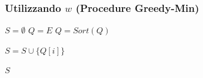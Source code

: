 \subsubsection{Utilizzando $w$ (Procedure Greedy-Min)}
\begin{algorithmic}
        \State $S = \emptyset$
        \State $Q = E$
        \State $Q = Sort(Q)$ 

                \State $S = S \cup \{Q[i]\}$
            \EndIf
        \EndFor

        \State \Return $S$
\EndProcedure
\end{algorithmic}